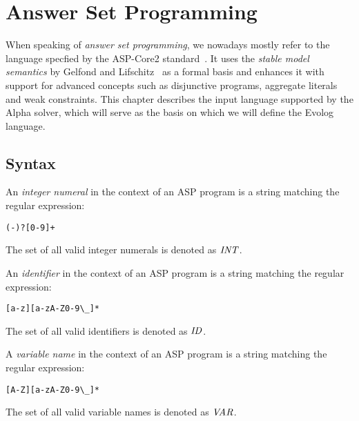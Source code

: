 \section{Answer Set Programming}

When speaking of \emph{answer set programming}, we nowadays mostly refer to the language specfied by the ASP-Core2 standard~\cite{asp-core2}. It uses the \emph{stable model semantics} by Gelfond and Lifschitz~\cite{stable-models} as a formal basis and enhances it with support for advanced concepts such as disjunctive programs, aggregate literals and weak constraints. This chapter describes the input language supported by the Alpha solver, which will serve as the basis on which we will define the Evolog language.


\subsection{Syntax}
\label{subsec:prelims-asp-syntax}

\begin{definition}
\label{def:prelims-asp-syntax-int}
An \emph{integer numeral} in the context of an ASP program is a string matching the regular expression:
\begin{lstlisting}[style=code]
(-)?[0-9]+
\end{lstlisting}
The set of all valid integer numerals is denoted as $\mathit{INT}$.
\end{definition}

\begin{definition}[Identifier]
\label{def:prelims-asp-syntax-id}
An \emph{identifier} in the context of an ASP program is a string matching the regular expression:
\begin{lstlisting}[style=code]
[a-z][a-zA-Z0-9\_]*
\end{lstlisting}
The set of all valid identifiers is denoted as $\mathit{ID}$.
\end{definition}

\begin{definition}
\label{def:prelims-asp-syntax-var}
A \emph{variable name} in the context of an ASP program is a string matching the regular expression:
\begin{lstlisting}[style=code]
[A-Z][a-zA-Z0-9\_]*
\end{lstlisting}
The set of all valid variable names is denoted as $\mathit{VAR}$.
\end{definition}


